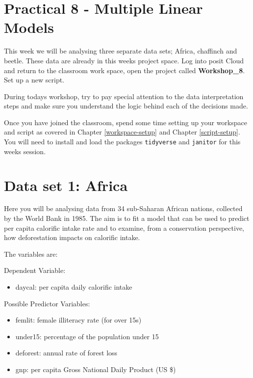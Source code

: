 \documentclass[
]{book}
\providecommand{\tightlist}{%
  \setlength{\itemsep}{0pt}\setlength{\parskip}{0pt}}
\begin{document}
\section{Practical 8 - Multiple Linear Models}\label{practical-8---multiple-linear-models}

This week we will be analysing three separate data sets; Africa, chaffinch and beetle. These data are already in this weeks project space. Log into posit Cloud and return to the classroom work space, open the project called \textbf{Workshop\_8}. Set up a new script.

During todays workshop, try to pay special attention to the data interpretation steps and make sure you understand the logic behind each of the decisions made.

Once you have joined the classroom, spend some time setting up your workspace and script as covered in Chapter \ref{workspace-setup} and Chapter \ref{script-setup}. You will need to install and load the packages \texttt{tidyverse} and \texttt{janitor} for this weeks session.

\section{Data set 1: Africa}\label{data-set-1-africa}

Here you will be analysing data from 34 sub-Saharan African nations, collected by the World Bank in 1985. The aim is to fit a model that can be used to predict per capita calorific intake rate and to examine, from a conservation perspective, how deforestation impacts on calorific intake.

The variables are:

Dependent Variable:

\begin{itemize}
\tightlist
\item
  daycal: per capita daily calorific intake
\end{itemize}

Possible Predictor Variables:

\begin{itemize}
\tightlist
\item
  femlit: female illiteracy rate (for over 15s)
\item
  under15: percentage of the population under 15
\item
  deforest: annual rate of forest loss
\item
  gnp: per capita Gross National Daily Product (US \$)
\end{itemize}
\end{document}
